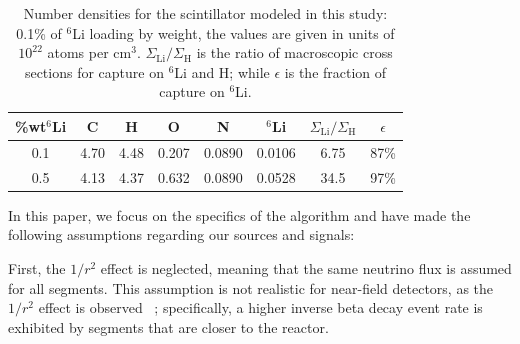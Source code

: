 \documentclass[tightenlines,
twocolumn,prl,notitlepage,nofootinbib,preprintnumbers,longbibliography]{revtex4-1}
\begin{document}
\begin{table}[h]
    \centering
    \begin{tabular}{|c|c|c|c|c|c|c|c|}
        \hline
        \%\;wt\;$^6$Li & C & H & O & N & $^6$Li & $\Sigma_{\mathrm{Li}} / \Sigma_\mathrm{H}$ &  $\epsilon$ \\
        \hline
        0.1 & 4.70 & 4.48 & 0.207 & 0.0890 & 0.0106 & 6.75 & 87\% \\
        \hline
        0.5 & 4.13 & 4.37 & 0.632 & 0.0890 & 0.0528 & 34.5 & 97\% \\
        \hline
    \end{tabular}
\caption{Number densities for the scintillator modeled in this study: 0.1\% of $^6$Li loading by weight, the values are given in units of $10^{22}$ atoms per cm$^3$. $\Sigma_{\mathrm{Li}} / \Sigma_\mathrm{H}$ is the ratio of macroscopic cross sections for capture on $^6$Li and H; while $\epsilon$ is the fraction of capture on $^6$Li.}
    \label{tab:li6_loading}
\end{table}







In this paper, we focus on the specifics of the algorithm and have made the following assumptions regarding our sources and signals:

First, the \(1/r^2\) effect is neglected, meaning that the same neutrino flux is assumed for all segments. This assumption is not realistic for near-field detectors, as the \(1/r^2\) effect is observed~\cite{Jayakumar:2024job} \cite{AlekseevI.2025Ltrr}; specifically, a higher inverse beta decay event rate is exhibited by segments that are closer to the reactor.
    
\end{document}
